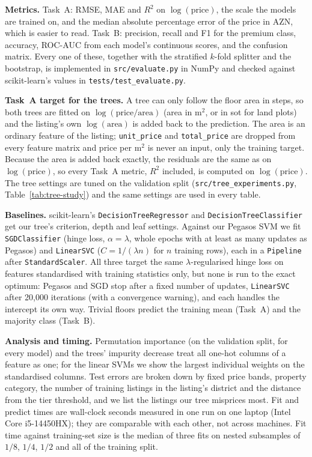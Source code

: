\documentclass[10pt,twocolumn,a4paper]{article}
\begin{document}
\textbf{Metrics.} Task~A: RMSE, MAE and $R^2$ on $\log(\text{price})$, the
scale the models are trained on, and the median absolute percentage error of
the price in AZN, which is easier to read. Task~B: precision, recall and F1
for the premium class, accuracy, ROC-AUC from each model's continuous scores,
and the confusion matrix. Every one of these, together with the stratified
$k$-fold splitter and the bootstrap, is implemented in
\texttt{src/evaluate.py} in NumPy and checked against scikit-learn's values in
\texttt{tests/test\_evaluate.py}.

\textbf{Task~A target for the trees.} A tree can only follow the floor area
in steps, so both trees are fitted on $\log(\text{price}/\text{area})$ (area
in m$^2$, or in sot for land plots) and the listing's own $\log(\text{area})$
is added back to the prediction. The area is an ordinary feature of the
listing; \texttt{unit\_price} and \texttt{total\_price} are dropped from
every feature matrix and price per m$^2$ is never an input, only the training
target. Because the area is added back exactly, the residuals are the same as
on $\log(\text{price})$, so every Task~A metric, $R^2$ included, is computed
on $\log(\text{price})$. The tree settings are tuned on the validation split
(\texttt{src/tree\_experiments.py}, Table~\ref{tab:tree-study}) and the same
settings are used in every table.

\textbf{Baselines.} scikit-learn's \texttt{DecisionTreeRegressor} and
\texttt{DecisionTreeClassifier} get our tree's criterion, depth and leaf
settings. Against our Pegasos SVM we fit \texttt{SGDClassifier} (hinge loss,
$\alpha=\lambda$, whole epochs with at least as many updates as Pegasos) and
\texttt{LinearSVC} ($C=1/(\lambda n)$ for $n$ training rows), each in a
\texttt{Pipeline} after \texttt{StandardScaler}. All three target the same
$\lambda$-regularised hinge loss on features standardised with training
statistics only, but none is run to the exact optimum: Pegasos and SGD stop
after a fixed number of updates, \texttt{LinearSVC} after 20{,}000
iterations (with a convergence warning), and each handles the intercept its
own way. Trivial floors predict the training mean (Task~A) and the majority
class (Task~B).

\textbf{Analysis and timing.} Permutation importance (on the validation
split, for every model) and the trees' impurity decrease treat all one-hot
columns of a feature as one; for the linear SVMs we show the largest
individual weights on the standardised columns. Test errors are broken down
by fixed price bands, property category, the number of training listings in
the listing's district and the distance from the tier threshold, and we list
the listings our tree misprices most.
Fit and predict times are wall-clock seconds measured in one run on one
laptop (Intel Core i5-14450HX); they are comparable with each other, not
across machines. Fit time against training-set size is the median of three
fits on nested subsamples of $1/8$, $1/4$, $1/2$ and all of the training
split.
\end{document}
